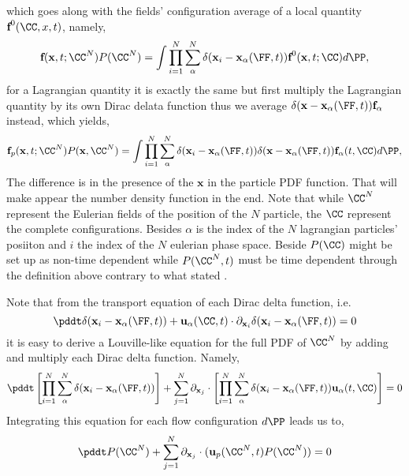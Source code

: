 which goes along with the fields' configuration average of a local quantity $\textbf{f}^0(\CC,x,t)$, namely, 
\begin{equation*}
    \textbf{f}(\textbf{x},t;\CC^N) P(\CC^N)
    = \int 
    \prod_{i=1}^{N}\sum_{\alpha}^{N}\delta(\textbf{x}_i - \textbf{x}_\alpha(\FF,t)) \textbf{f}^0(\textbf{x},t;\CC)
    d\PP,
\end{equation*}
for a Lagrangian quantity it is exactly the same but first multiply the Lagrangian quantity by its own Dirac delata function thus we average $\delta(\textbf{x}-\textbf{x}_\alpha(\FF,t)) \textbf{f}_\alpha$ instead, which yields, 
\begin{equation*}
    \textbf{f}_p(\textbf{x},t;\CC^N) P(\textbf{x},\CC^N)
    = \int 
    \prod_{i=1}^{N}\sum_{\alpha}^{N}\delta(\textbf{x}_i - \textbf{x}_\alpha(\FF,t)) 
    \delta(\textbf{x} - \textbf{x}_\alpha(\FF,t)) 
    \textbf{f}_\alpha(t,\CC)
    d\PP,
\end{equation*}
The difference is in the presence of the $\textbf{x}$ in the particle PDF function. 
That will make appear the number density function in the end. 
Note that while $\CC^N$ represent the Eulerian fields of the position of the $N$ particle, the $\CC$ represent the complete configurations.
Besides $\alpha$ is the index of the $N$ lagrangian particles' posiiton and $i$ the index of the $N$ eulerian phase space.
Beside $P(\CC)$  might be set up as non-time dependent while $P(\CC^N,t)$ must be time dependent through the definition above contrary to what stated \citet{zhang1994ensemble}. 

Note that from the transport equation of each Dirac delta function, i.e. 
\begin{equation*}
    \pddt \delta(\textbf{x}_i - \textbf{x}_\alpha(\FF,t))
    + \textbf{u}_\alpha(\CC,t)\cdot\partial_{\textbf{x}_i}\delta(\textbf{x}_i-\textbf{x}_\alpha(\FF,t))
    =0 
\end{equation*}
it is easy to derive a Louville-like equation for the full PDF of $\CC^N$ by adding and multiply each Dirac delta function. 
Namely, 
\begin{equation*}
    \pddt \left[
        \prod_{i=1}^{N}\sum_{\alpha}^{N}\delta(\textbf{x}_i - \textbf{x}_\alpha(\FF,t)) 
    \right]
    + 
    \sum_{j=1}^N \partial_{\textbf{x}_j}\cdot\left[
        \prod_{i=1}^{N}\sum_{\alpha}^{N}\delta(\textbf{x}_i - \textbf{x}_\alpha(\FF,t)) \textbf{u}_\alpha(t,\CC) 
    \right]
    =0 
\end{equation*}
Integrating this equation for each flow configuration $d\PP$ leads us to, 
\begin{equation*}
    \pddt P(\CC^N)
    + 
    \sum_{j=1}^N \partial_{\textbf{x}_j} \cdot
    (\textbf{u}_p(\CC^N,t) P(\CC^N) )
    =0 
\end{equation*}


